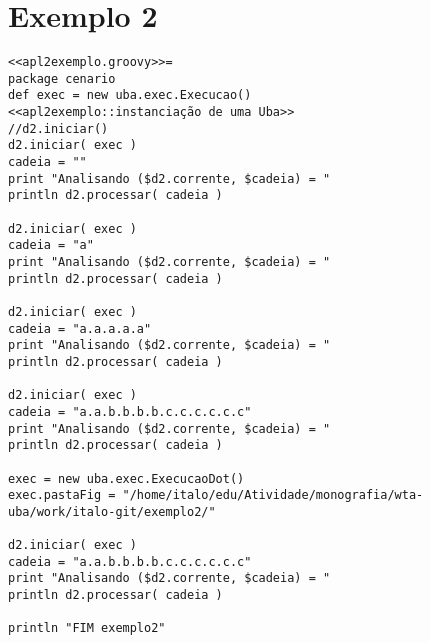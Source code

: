 
\section{Exemplo 2}


\begin{lstlisting}
<<apl2exemplo.groovy>>=
package cenario
def exec = new uba.exec.Execucao()
<<apl2exemplo::instanciação de uma Uba>>
//d2.iniciar()
d2.iniciar( exec )
cadeia = ""
print "Analisando ($d2.corrente, $cadeia) = "
println d2.processar( cadeia )

d2.iniciar( exec )
cadeia = "a"
print "Analisando ($d2.corrente, $cadeia) = "
println d2.processar( cadeia )

d2.iniciar( exec )
cadeia = "a.a.a.a.a"
print "Analisando ($d2.corrente, $cadeia) = "
println d2.processar( cadeia )

d2.iniciar( exec )
cadeia = "a.a.b.b.b.b.c.c.c.c.c.c"
print "Analisando ($d2.corrente, $cadeia) = "
println d2.processar( cadeia )

exec = new uba.exec.ExecucaoDot()
exec.pastaFig = "/home/italo/edu/Atividade/monografia/wta-uba/work/italo-git/exemplo2/"

d2.iniciar( exec )
cadeia = "a.a.b.b.b.b.c.c.c.c.c.c"
print "Analisando ($d2.corrente, $cadeia) = "
println d2.processar( cadeia )

println "FIM exemplo2"
\end{lstlisting}
